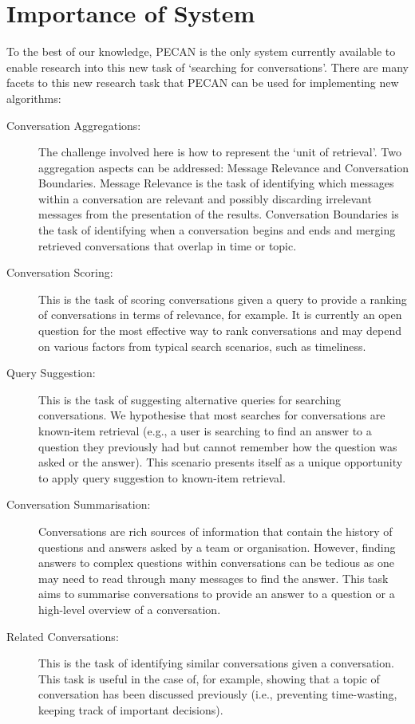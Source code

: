 \section{Importance of System}

To the best of our knowledge, PECAN is the only system currently available to enable research into this new task of `searching for conversations'. There are many facets to this new research task that PECAN can be used for implementing new algorithms:

\begin{description}
\item[Conversation Aggregations:] The challenge involved here is how to represent the `unit of retrieval'. Two aggregation aspects can be addressed: Message Relevance and Conversation Boundaries. Message Relevance is the task of identifying which messages within a conversation are relevant and possibly discarding irrelevant messages from the presentation of the results. Conversation Boundaries is the task of identifying when a conversation begins and ends and merging retrieved conversations that overlap in time or topic.
\item[Conversation Scoring:] This is the task of scoring conversations given a query to provide a ranking of conversations in terms of relevance, for example. It is currently an open question for the most effective way to rank conversations and may depend on various factors from typical search scenarios, such as timeliness.
\item[Query Suggestion:] This is the task of suggesting alternative queries for searching conversations. We hypothesise that most searches for conversations are known-item retrieval (e.g., a user is searching to find an answer to a question they previously had but cannot remember how the question was asked or the answer). This scenario presents itself as a unique opportunity to apply query suggestion to known-item retrieval.
\item[Conversation Summarisation:] Conversations are rich sources of information that contain the history of questions and answers asked by a team or organisation. However, finding answers to complex questions within conversations can be tedious as one may need to read through many messages to find the answer. This task aims to summarise conversations to provide an answer to a question or a high-level overview of a conversation.
\item[Related Conversations:] This is the task of identifying similar conversations given a conversation. This task is useful in the case of, for example, showing that a topic of conversation has been discussed previously (i.e., preventing time-wasting, keeping track of important decisions).
\end{description}
 
 